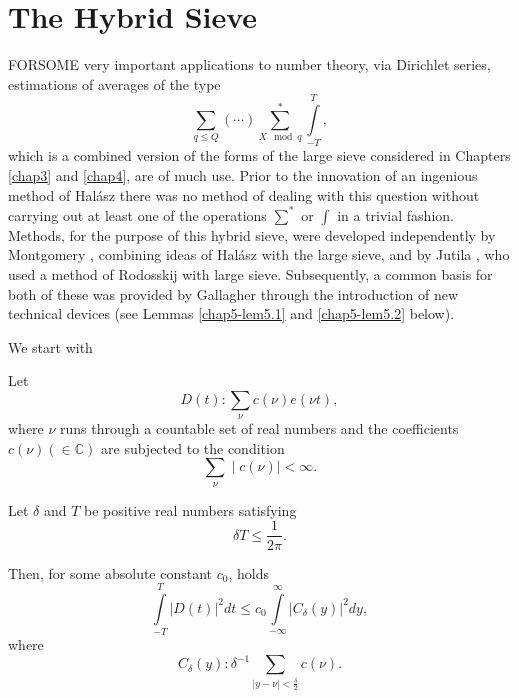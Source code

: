 

\chapter{The Hybrid Sieve}\label{chap5}%

FOR\pageoriginale SOME very important applications to number theory,
via Dirichlet series, estimations of averages of the type 
\begin{equation*}
\sum_{q \leq Q}(\cdots) \sum^*_{X \mod q} \int\limits^T_{-T},
\tag{5.1}\label{eq5.1} 
\end{equation*}
which is a combined version of the forms of the large sieve considered
in Chapters \ref{chap3} and \ref{chap4}, are of much use. Prior to the
innovation of 
an ingenious method of Hal\'asz \cite{key1} there was no method of dealing
with this question without carrying out at least one of the operations
$\sum^*$ or $\int$ in a trivial fashion. Methods, for the purpose of
this hybrid sieve, were developed independently by Montgomery \cite{key2},
combining ideas of Hal\'asz with the large sieve, and by Jutila \cite{key1},
who used a method of Rodosskij with large sieve. Subsequently, a
common basis for both of these was provided by Gallagher \cite{key4}
through the introduction of new technical devices (see Lemmas
\ref{chap5-lem5.1} and \ref{chap5-lem5.2} below). 

We start with
\setcounter{section}{5}
\setcounter{lemma}{0}
\begin{lemma}\label{chap5-lem5.1} %
Let
\begin{equation*}
D(t) : \sum_\nu c (\nu ) e(\nu t ), \tag{5.2}\label{eq5.2}
\end{equation*}
where $\nu$ runs through a countable set of real numbers and the
coefficients $c(\nu ) (\in \mathbb{C})$ are subjected to the condition 
\begin{equation*}
\sum_\nu \mid c (\nu ) \mid < \infty . \tag{5.3}\label{eq5.3}
\end{equation*}
\end{lemma}

Let $\delta$ and $T$ be positive real numbers satisfying
\begin{equation*}
\delta T \leq \frac{1}{2 \pi}. \tag{5.4}\label{eq5.4}
\end{equation*}

Then, for some absolute constant $c_0$, holds
\begin{equation*}
\int\limits^T_{-T} | D (t) |^2 dt \le c_0 \int\limits^\infty_{-
  \infty} | C_\delta (y) |^2 dy, \tag{5.5}\label{eq5.5} 
\end{equation*}\pageoriginale
where
\begin{equation*}
C_\delta(y) : \delta^{-1} \sum_{\mid y - \nu \mid < \frac{\delta}{2}}
c(\nu ). \tag{5.6}\label{eq5.6} 
\end{equation*}

